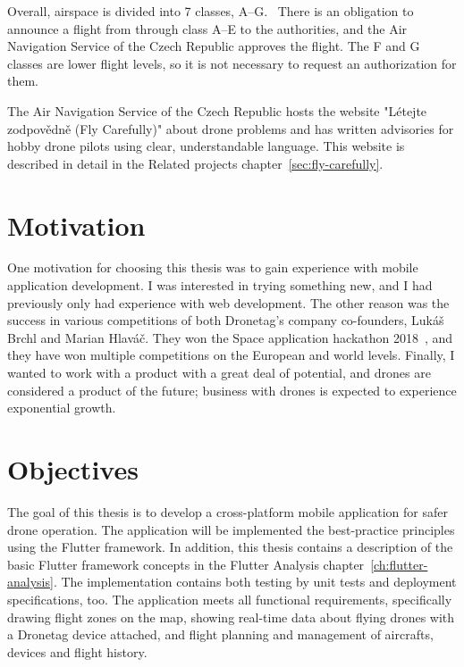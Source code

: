 Overall, airspace is divided into 7 classes, A--G.~\cite{airspace}
There is an obligation to announce a flight from through class A--E to the authorities, and the Air Navigation Service of the Czech Republic approves the flight.
The F and G classes are lower flight levels, so it is not necessary to request an authorization for them.

The Air Navigation Service of the Czech Republic hosts the website "L{\' e}tejte zodpov{\v e}dn{\v e} (Fly Carefully)" about drone problems and has written advisories for hobby drone pilots using clear, understandable language.
This website is described in detail in the Related projects chapter~\ref{sec:fly-carefully}.


\section{Motivation}\label{sec:motivation}
One motivation for choosing this thesis was to gain experience with mobile application development.
I was interested in trying something new, and I had previously only had experience with web development.
The other reason was the success in various competitions of both Dronetag's company co-founders, Luk{\' a}{\v s} Brchl and Marian Hlav{\' a}{\v c}.
They won the Space application hackathon 2018~\cite{spaceHackathon}, and they have won multiple competitions on the European and world levels.
Finally, I wanted to work with a product with a great deal of potential, and drones are considered a product of the future;
business with drones is expected to experience exponential growth.


\section{Objectives}\label{sec:objectives}
The goal of this thesis is to develop a cross-platform mobile application for safer drone operation.
The application will be implemented the best-practice principles using the Flutter framework.
In addition, this thesis contains a description of the basic Flutter framework concepts in the Flutter Analysis chapter~\ref{ch:flutter-analysis}.
The implementation contains both testing by unit tests and deployment specifications, too.
The application meets all functional requirements, specifically drawing flight zones on the map, showing real-time data about flying drones with a Dronetag device attached, and flight planning and management of aircrafts, devices and flight history.

